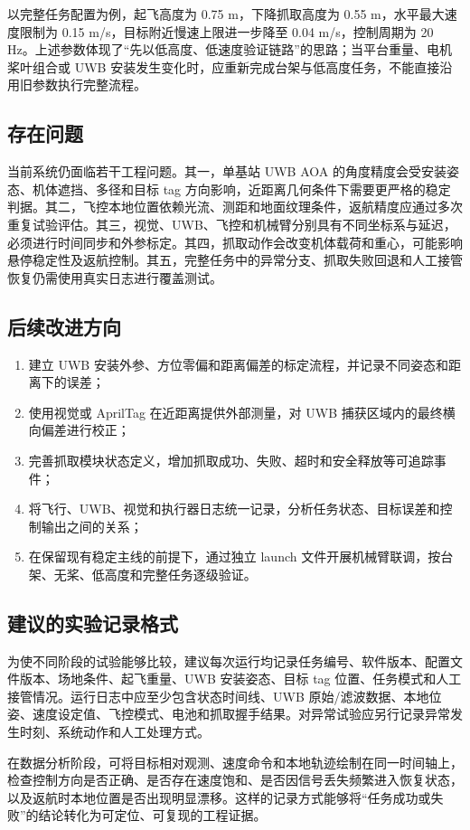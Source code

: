 \documentclass[12pt,a4paper]{ctexart}
\begin{document}
以完整任务配置为例，起飞高度为 0.75 m，下降抓取高度为 0.55 m，水平最大速度限制为 0.15 m/s，目标附近慢速上限进一步降至 0.04 m/s，控制周期为 20 Hz。上述参数体现了“先以低高度、低速度验证链路”的思路；当平台重量、电机桨叶组合或 UWB 安装发生变化时，应重新完成台架与低高度任务，不能直接沿用旧参数执行完整流程。

\subsection{存在问题}
当前系统仍面临若干工程问题。其一，单基站 UWB AOA 的角度精度会受安装姿态、机体遮挡、多径和目标 tag 方向影响，近距离几何条件下需要更严格的稳定判据。其二，飞控本地位置依赖光流、测距和地面纹理条件，返航精度应通过多次重复试验评估。其三，视觉、UWB、飞控和机械臂分别具有不同坐标系与延迟，必须进行时间同步和外参标定。其四，抓取动作会改变机体载荷和重心，可能影响悬停稳定性及返航控制。其五，完整任务中的异常分支、抓取失败回退和人工接管恢复仍需使用真实日志进行覆盖测试。

\subsection{后续改进方向}
\begin{enumerate}
  \item 建立 UWB 安装外参、方位零偏和距离偏差的标定流程，并记录不同姿态和距离下的误差；
  \item 使用视觉或 AprilTag 在近距离提供外部测量，对 UWB 捕获区域内的最终横向偏差进行校正；
  \item 完善抓取模块状态定义，增加抓取成功、失败、超时和安全释放等可追踪事件；
  \item 将飞行、UWB、视觉和执行器日志统一记录，分析任务状态、目标误差和控制输出之间的关系；
  \item 在保留现有稳定主线的前提下，通过独立 launch 文件开展机械臂联调，按台架、无桨、低高度和完整任务逐级验证。
\end{enumerate}

\subsection{建议的实验记录格式}
为使不同阶段的试验能够比较，建议每次运行均记录任务编号、软件版本、配置文件版本、场地条件、起飞重量、UWB 安装姿态、目标 tag 位置、任务模式和人工接管情况。运行日志中应至少包含状态时间线、UWB 原始/滤波数据、本地位姿、速度设定值、飞控模式、电池和抓取握手结果。对异常试验应另行记录异常发生时刻、系统动作和人工处理方式。

在数据分析阶段，可将目标相对观测、速度命令和本地轨迹绘制在同一时间轴上，检查控制方向是否正确、是否存在速度饱和、是否因信号丢失频繁进入恢复状态，以及返航时本地位置是否出现明显漂移。这样的记录方式能够将“任务成功或失败”的结论转化为可定位、可复现的工程证据。
\end{document}
